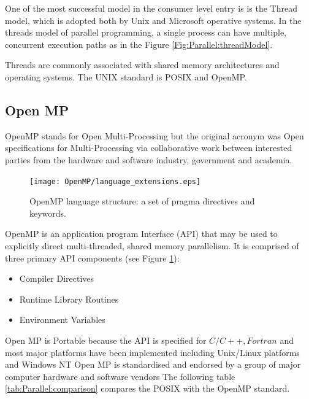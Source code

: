 One of the most successful model in the consumer level entry is is the
Thread model, which is adopted both
by Unix and Microsoft operative systems.
In the threads model of parallel programming, a single process can have
 multiple, concurrent execution paths as in the Figure \ref{Fig:Parallel:threadModel}.

Threads are commonly associated with shared memory architectures
and operating systems.
The UNIX standard is POSIX and OpenMP.
\subsection{Open MP}
OpenMP stands for Open Multi-Processing but the original acronym was
Open specifications for Multi-Processing via collaborative work between
interested parties from the hardware and software industry, government and academia.

\begin{figure}[htbp]
\begin{center}
\texttt{[image: OpenMP/language\_extensions.eps]}
\end{center}
\small{
\caption[OpenMP language]{
OpenMP language structure: a set of pragma directives and keywords.
\label{Fig:Parallel:language}}}
\end{figure}

OpenMP is an application program Interface (API) that may be used to explicitly
 direct multi-threaded, shared memory parallelism.
It is comprised of three primary API components (see Figure \ref{Fig:Parallel:language}):
\begin{itemize}
\item Compiler Directives
\item Runtime Library Routines
\item Environment Variables
\end{itemize}
Open MP is Portable because the API is specified for $C/C++,Fortran$ and
most major platforms have been implemented including Unix/Linux platforms and Windows NT
Open MP is standardised and endorsed by a group of major computer hardware
and software vendors
The following table \ref{tab:Parallel:comparison} compares the POSIX  with
the OpenMP  standard.


